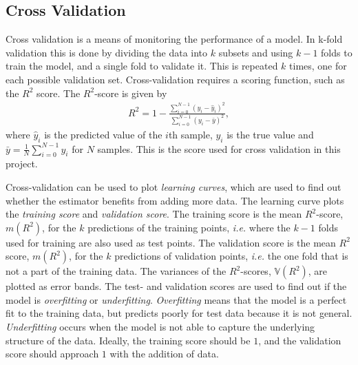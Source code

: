 \documentclass[twoside,english]{uiofysmaster}
\begin{document}
\subsection{Cross Validation}\label{Sec:: gaussian process : Cross Validation}


Cross validation is a means of monitoring the performance of a model. In k-fold validation this is done by dividing the data into $k$ subsets and using $k-1$ folds to train the model, and a single fold to validate it. This is repeated $k$ times, one for each possible validation set. Cross-validation requires a scoring function, such as the $R^2$ score. The $R^2$-score is given by 
\begin{align}
R^2 = 1 - \frac{\sum_{i=0}^{N-1} (y_i - \hat{y}_i)^2}{\sum_{i=0}^{N-1} (y_i - \bar{y})^2},
\end{align}
where $\hat{y}_i$ is the predicted value of the $i$th sample, $y_i$ is the true value and $\bar{y} = \frac{1}{N} \sum_{i = 0}^{N-1} y_i$ for $N$ samples. This is the score used for cross validation in this project.

Cross-validation can be used to plot \textit{learning curves}, which are used to find out whether the estimator benefits from adding more data. The learning curve plots the \textit{training score} and \textit{validation score}. The training score is the mean $R^2$-score, $m(R^2)$, for the $k$ predictions of the training points, \textit{i.e.} where the $k-1$ folds used for training are also used as test points. The validation score is the mean $R^2$ score, $m(R^2)$, for the $k$ predictions of validation points, \textit{i.e.} the one fold that is not a part of the training data. The variances of the $R^2$-scores, $\mathbb{V}(R^2)$, are plotted as error bands. The test- and validation scores are used to find out if the model is \textit{overfitting} or \textit{underfitting}. \textit{Overfitting} means that the model is a perfect fit to the training data, but predicts poorly for test data because it is not general. \textit{Underfitting} occurs when the model is not able to capture the underlying structure of the data. Ideally, the training score should be $1$, and the validation score should approach $1$ with the addition of data.
\end{document}
